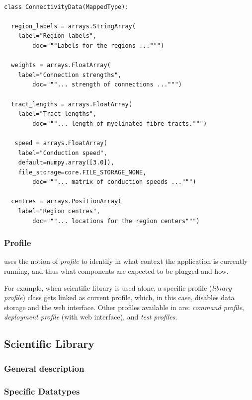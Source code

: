 \begin{lstlisting}

class ConnectivityData(MappedType):

  region_labels = arrays.StringArray( 
	label="Region labels", 
        doc="""Labels for the regions ...""")

  weights = arrays.FloatArray( 
	label="Connection strengths",
        doc="""... strength of connections ...""")

  tract_lengths = arrays.FloatArray( 
	label="Tract lengths",
        doc="""... length of myelinated fibre tracts.""")

   speed = arrays.FloatArray( 
	label="Conduction speed", 
	default=numpy.array([3.0]), 
	file_storage=core.FILE_STORAGE_NONE,
        doc="""... matrix of conduction speeds ...""")

  centres = arrays.PositionArray( 
	label="Region centres",
        doc="""... locations for the region centers""")

\end{lstlisting}

	\subsubsection{Profile}

\TVB uses the notion of \emph{profile} to identify in what context the application is currently running,
and thus what components are expected to be plugged and how.

For example, when \TVB scientific library is used alone, a specific profile (\emph{library profile}) class 
gets linked as current profile, which, in this case, disables data storage and the web interface. Other profiles available
in \TVB are: \emph{command profile}, \emph{deployment profile} (with web interface), and \emph{test profiles}.

	\subsection{\TVB Scientific Library}

	\subsubsection{General description}

	\subsubsection{\TVB Specific Datatypes}

